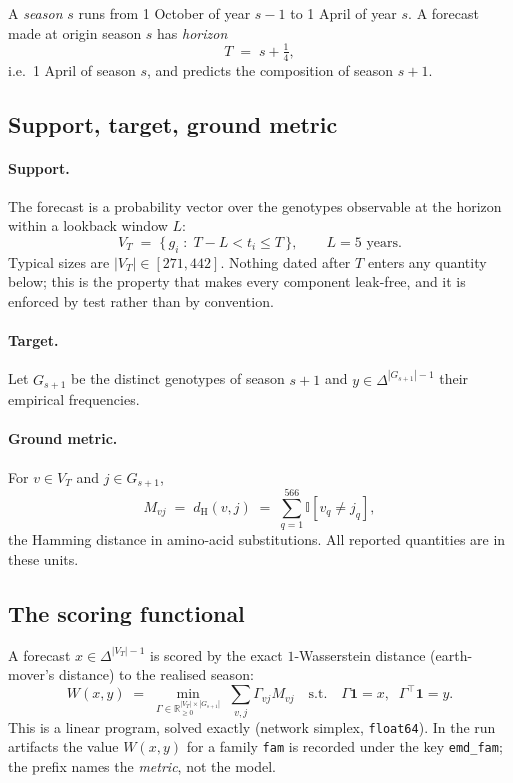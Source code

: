 \documentclass[11pt]{article}
\theoremstyle{remark}
\newcommand{\R}{\mathbb{R}}
\newcommand{\1}{\mathbf{1}}
\newcommand{\Ind}[1]{\mathbb{I}\!\left[#1\right]}
\newcommand{\VT}{V_T}
\begin{document}
A \emph{season} $s$ runs from 1 October of year $s-1$ to 1 April of year $s$. A forecast
made at origin season $s$ has \emph{horizon}
\begin{equation}
  T \;=\; s + \tfrac14,
\end{equation}
i.e.\ 1 April of season $s$, and predicts the composition of season $s+1$.

\subsection{Support, target, ground metric}

\paragraph{Support.} The forecast is a probability vector over the genotypes observable
at the horizon within a lookback window $L$:
\begin{equation}
  \VT \;=\; \bigl\{\, g_i \;:\; T - L < t_i \le T \,\bigr\},
  \qquad L = 5 \text{ years}.
\end{equation}
Typical sizes are $|\VT| \in [271, 442]$. Nothing dated after $T$ enters any quantity
below; this is the property that makes every component leak-free, and it is enforced by
test rather than by convention.

\paragraph{Target.} Let $G_{s+1}$ be the distinct genotypes of season $s+1$ and
$y \in \Delta^{|G_{s+1}|-1}$ their empirical frequencies.

\paragraph{Ground metric.} For $v \in \VT$ and $j \in G_{s+1}$,
\begin{equation}
  M_{vj} \;=\; d_{\mathrm H}(v, j) \;=\; \sum_{q=1}^{566} \Ind{v_q \neq j_q},
\end{equation}
the Hamming distance in amino-acid substitutions. All reported quantities are in these
units.

\subsection{The scoring functional}

A forecast $x \in \Delta^{|\VT|-1}$ is scored by the exact $1$-Wasserstein distance
(earth-mover's distance) to the realised season:
\begin{equation}
  W(x, y) \;=\; \min_{\Gamma \in \R_{\ge0}^{|\VT| \times |G_{s+1}|}}
  \; \sum_{v,j} \Gamma_{vj} M_{vj}
  \quad\text{s.t.}\quad \Gamma \1 = x,\;\; \Gamma^\top \1 = y .
  \label{eq:emd}
\end{equation}
This is a linear program, solved exactly (network simplex, \texttt{float64}). In the run
artifacts the value $W(x,y)$ for a family \texttt{fam} is recorded under the key
\texttt{emd\_fam}; the prefix names the \emph{metric}, not the model.
\end{document}
